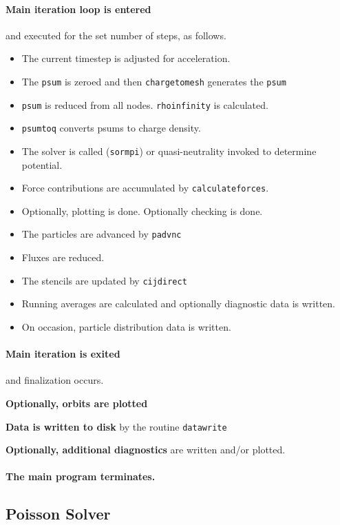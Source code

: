 \documentclass[12pt]{article}
\def\sentence#1{\par\noindent\textbf{#1}}
\begin{document}
\paragraph{Main iteration loop is entered} and executed for the set
number of steps, as follows.
\begin{itemize}\itemsep=0pt
\item The current timestep is adjusted for acceleration.
\item The \verb!psum! is zeroed and then \verb!chargetomesh! generates
  the \verb!psum!
\item \verb!psum! is reduced from all nodes. \verb!rhoinfinity! is calculated.
\item \verb!psumtoq! converts psums to charge density.
\item The solver is called (\verb!sormpi!) or
  quasi-neutrality invoked to determine potential.
\item Force contributions are accumulated by \verb!calculateforces!.
\item Optionally, plotting is done. Optionally checking is done.
\item The particles are advanced by \verb!padvnc!
\item Fluxes are reduced.
\item The stencils are updated by \verb!cijdirect!
\item Running averages are calculated and optionally diagnostic data
  is written. 
\item On occasion, particle distribution data is written. 
\end{itemize}


\paragraph{Main iteration is exited} and finalization occurs.

\sentence{Optionally, orbits are plotted}

\sentence{Data is written to disk} by the routine \verb!datawrite!

\sentence{Optionally, additional diagnostics} are written and/or
plotted.

\paragraph{The main program terminates.}

\subsection{Poisson Solver}
\end{document}
